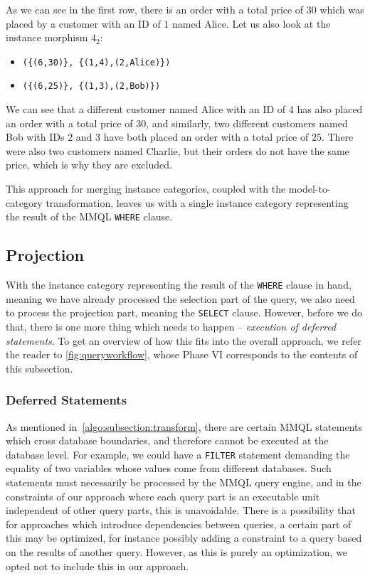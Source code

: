As we can see in the first row, there is an order with a total price of $30$ which was placed by a customer with an ID of $1$ named Alice.
Let us also look at the instance morphism $4_2$:

\begin{itemize}
    \item \texttt{(\{(6,30)\}, \{(1,4),(2,Alice)\})}
    \item \texttt{(\{(6,25)\}, \{(1,3),(2,Bob)\})}
\end{itemize}

We can see that a different customer named Alice with an ID of 4 has also placed an order with a total price of $30$, and similarly, two different customers named Bob with IDs $2$ and $3$ have both placed an order with a total price of $25$.
There were also two customers named Charlie, but their orders do not have the same price, which is why they are excluded.

This approach for merging instance categories, coupled with the model-to-category transformation, leaves us with a single instance category representing the result of the MMQL \texttt{WHERE} clause.

\subsection{Projection}
\label{algo:subsection:projection}

With the instance category representing the result of the \texttt{WHERE} clause in hand, meaning we have already processed the selection part of the query, we also need to process the projection part, meaning the \texttt{SELECT} clause.
However, before we do that, there is one more thing which needs to happen -- \textit{execution of deferred statements}.
To get an overview of how this fits into the overall approach, we refer the reader to \cref{fig:queryworkflow}, whose Phase VI corresponds to the contents of this subsection.

\subsubsection{Deferred Statements}

As mentioned in~\cref{algo:subsection:transform}, there are certain MMQL statements which cross database boundaries, and therefore cannot be executed at the database level.
For example, we could have a \texttt{FILTER} statement demanding the equality of two variables whose values come from different databases.
Such statements must necessarily be processed by the MMQL query engine, and in the constraints of our approach where each query part is an executable unit independent of other query parts, this is unavoidable.
There is a possibility that for approaches which introduce dependencies between queries, a certain part of this may be optimized, for instance possibly adding a constraint to a query based on the results of another query.
However, as this is purely an optimization, we opted not to include this in our approach.

